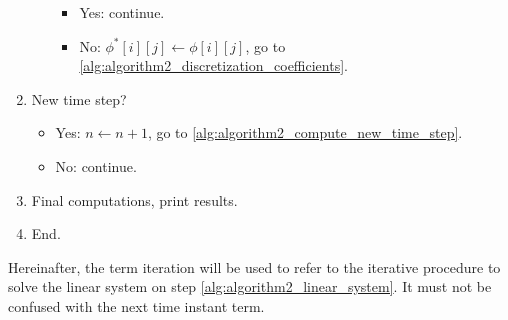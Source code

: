 \begin{algorithm}[h]
\begin{algorithmic}[0]
\begin{enumerate}[label=\textbf{\arabic*},topsep=0pt]
\begin{enumerate}[label=\textbf{4.\arabic*}]
				\begin{itemize}
					\item Yes: continue.
					\item No: $\phi^\ast[i][j] \gets \phi[i][j]$, go to \ref{alg:algorithm2_discretization_coefficients}.
				\end{itemize}
			\end{enumerate}
			\item New time step?
			\begin{itemize}
				\item Yes: $n \gets n + 1$, go to \ref{alg:algorithm2_compute_new_time_step}.
				\item No: continue.
			\end{itemize}
			\item Final computations, print results.
			\item End.
		\end{enumerate}
	\end{algorithmic}
\end{algorithm}

Hereinafter, the term iteration will be used to refer to the iterative procedure to solve the linear system on step \ref{alg:algorithm2_linear_system}. It must not be confused with the next time instant term.

